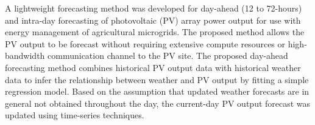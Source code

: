 A lightweight forecasting method was developed for day-ahead (12 to 72-hours) and intra-day forecasting of photovoltaic (PV) array power output for use with energy management of agricultural microgrids.
The proposed method allows the PV output to be forecast without requiring extensive compute resources or high-bandwidth communication channel to the PV site.
The proposed day-ahead forecasting method combines historical PV output data with historical weather data to infer the relationship between weather and PV output by fitting a simple regression model.
Based on the assumption that updated weather forecasts are in general not obtained throughout the day, the current-day PV output forecast was updated using time-series techniques.